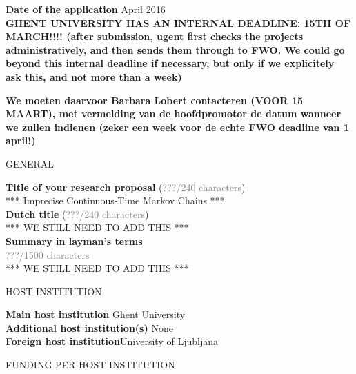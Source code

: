 \documentclass[11pt,dvipsnames,usenames,a4paper]{article}
\begin{document}
\newcommand{\todo}[1]{\textcolor{red}{\emph{#1}}}


{\bf Date of the application}  April 2016 \\


{\bf\color{blue} GHENT UNIVERSITY HAS AN INTERNAL DEADLINE: 15TH OF MARCH!!!! (after submission, ugent first checks the projects administratively, and then sends them through to FWO. We could go beyond this internal deadline if necessary, but only if we explicitely ask this, and not more than a week)}

{\bf\color{blue} We moeten daarvoor Barbara Lobert contacteren (VOOR 15 MAART), met vermelding van de hoofdpromotor de datum wanneer we zullen indienen (zeker een week voor de echte FWO deadline van 1 april!)}



\vspace{10pt}

\begin{shaded}\centering GENERAL \end{shaded}
\textbf{Title of your research proposal} (\textcolor{Gray}{???/240 characters})\\ *** Imprecise Continuous-Time Markov Chains *** \\[8pt]
\textbf{Dutch title} (\textcolor{Gray}{???/240 characters})\\
 *** WE STILL NEED TO ADD THIS ***\\[8pt]
\textbf{Summary in layman's terms}\\
\textcolor{Gray}{???/1500 characters}\\
*** WE STILL NEED TO ADD THIS ***


\vspace{10pt}

\begin{shaded}\centering HOST INSTITUTION \end{shaded}
\textbf{Main host institution} \tab Ghent University \\
\textbf{Additional host institution(s)} \tab None\\
\textbf{Foreign host institution}\tab University of Ljubljana \\

\begin{shaded}\centering FUNDING PER HOST INSTITUTION \end{shaded}
\end{document}
